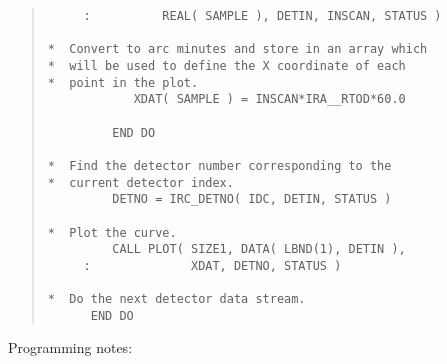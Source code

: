 \begin{quote}
\begin{tabbing}
\verb#     :          REAL( SAMPLE ), DETIN, INSCAN, STATUS )#\\
\verb#                                                       #\\
\verb#*  Convert to arc minutes and store in an array which  #\\
\verb#*  will be used to define the X coordinate of each     #\\
\verb#*  point in the plot.                                  #\\
\verb#            XDAT( SAMPLE ) = INSCAN*IRA__RTOD*60.0     #\\
\verb#                                                       #\\
\verb#         END DO                                        #\\
\verb#                                                       #\\
\verb#*  Find the detector number corresponding to the       #\\
\verb#*  current detector index.                             #\\
\verb#         DETNO = IRC_DETNO( IDC, DETIN, STATUS )       #\\
\verb#                                                       #\\
\verb#*  Plot the curve.                                     #\\
\verb#         CALL PLOT( SIZE1, DATA( LBND(1), DETIN ),     #\\
\verb#     :              XDAT, DETNO, STATUS )              #\\
\verb#                                                       #\\
\verb#*  Do the next detector data stream.                   #\\
\verb#      END DO                                           #\\

\end{tabbing}
\end{quote}

Programming notes:

